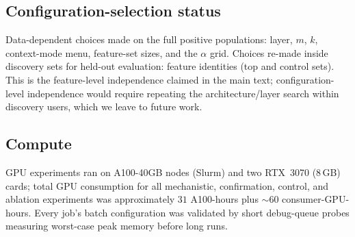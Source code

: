 \documentclass[10pt]{article} %
\begin{document}
\subsection{Configuration-selection status}
Data-dependent choices made on the full positive populations: layer, $m$,
$k$, context-mode menu, feature-set sizes, and the $\alpha$ grid. Choices
re-made inside discovery sets for held-out evaluation: feature identities
(top and control sets). This is the feature-level independence claimed in the
main text; configuration-level independence would require repeating the
architecture/layer search within discovery users, which we leave to future
work.

\subsection{Compute}
GPU experiments ran on A100-40GB nodes (Slurm) and two RTX~3070 (8\,GB)
cards; total GPU consumption for all mechanistic, confirmation, control, and
ablation experiments was approximately $31$ A100-hours plus $\sim$$60$
consumer-GPU-hours. Every job's batch configuration was validated by
short debug-queue probes measuring worst-case peak memory before long runs.
\end{document}
